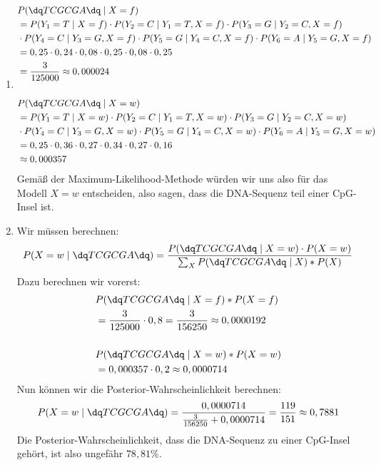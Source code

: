 \documentclass[a4paper,10pt]{article}
\begin{document}
    \begin{enumerate}[~~a.)]
	 \item
	 \begin{align*}
	     &P(\dq TCGCGA \dq \mid X = f) \\
	     &= P(Y_1 = T \mid X = f) \cdot P(Y_2 = C \mid Y_1 = T, X = f) \cdot P(Y_3 = G \mid Y_2 = C, X = f) \\
	     &\cdot P(Y_4 = C \mid Y_3 = G, X = f) \cdot P(Y_5 = G \mid Y_4 = C, X = f) \cdot P(Y_6 = A \mid Y_5 = G, X = f) \\
	     &= 0,25 \cdot 0,24 \cdot 0,08 \cdot 0,25 \cdot 0,08 \cdot 0,25 \\
	     &= \frac{3}{125000} \approx 0,000024\\
	     \\ 
	     &P(\dq TCGCGA \dq \mid X = w) \\
	     &= P(Y_1 = T \mid X = w) \cdot P(Y_2 = C \mid Y_1 = T, X = w) \cdot P(Y_3 = G \mid Y_2 = C, X = w) \\
	     &\cdot P(Y_4 = C \mid Y_3 = G, X = w) \cdot P(Y_5 = G \mid Y_4 = C, X = w) \cdot P(Y_6 = A \mid Y_5 = G, X = w) \\
	     &= 0,25 \cdot 0,36 \cdot 0,27 \cdot 0,34 \cdot 0,27 \cdot 0,16 \\
	     &\approx 0,000357
	 \end{align*}
	 Gemäß der Maximum-Likelihood-Methode würden wir uns also für das Modell $X = w$ entscheiden, also sagen, dass die DNA-Sequenz teil einer CpG-Insel ist.
	 
	 \item
	 Wir müssen berechnen:
	 \begin{align*}
	     P(X = w \mid \dq TCGCGA \dq) = \frac{P(\dq TCGCGA \dq \mid X = w) \cdot P(X = w)}{\sum_X P(\dq TCGCGA \dq \mid X) * P(X)}
	 \end{align*}
	 Dazu berechnen wir vorerst:
	 \begin{align*}
	     &P(\dq TCGCGA \dq \mid X = f) * P(X = f)\\ &= \frac{3}{125000} \cdot 0,8 = \frac{3}{156250} \approx 0,0000192\\ \\
	     &P(\dq TCGCGA \dq \mid X = w) * P(X = w)\\
	     &= 0,000357 \cdot 0,2 \approx 0,0000714
	 \end{align*}
	 Nun können wir die Posterior-Wahrscheinlichkeit berechnen:
	 \begin{align*}
	     P(X = w \mid \dq TCGCGA \dq) = \frac{0,0000714}{\frac{3}{156250} + 0,0000714} = \frac{119}{151} \approx 0,7881
	 \end{align*}
	 Die Posterior-Wahrscheinlichkeit, dass die DNA-Sequenz zu einer CpG-Insel gehört, ist also ungefähr $78,81 \%$.
	 

\end{enumerate}
\end{document}
